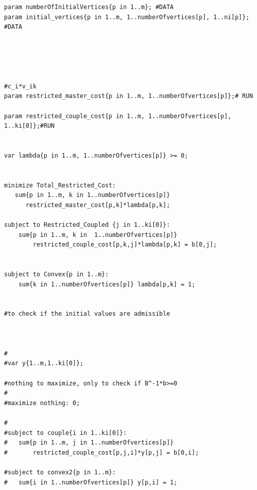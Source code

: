 \documentclass[a4paper,12pt]{article}
\begin{document}
\begin{lstlisting}
param numberOfInitialVertices{p in 1..m}; #DATA
param initial_vertices{p in 1..m, 1..numberOfvertices[p], 1..ni[p]}; #DATA





#c_i*v_ik
param restricted_master_cost{p in 1..m, 1..numberOfvertices[p]};# RUN

param restricted_couple_cost{p in 1..m, 1..numberOfvertices[p], 1..ki[0]};#RUN


var lambda{p in 1..m, 1..numberOfvertices[p]} >= 0;


minimize Total_Restricted_Cost:
   sum{p in 1..m, k in 1..numberOfvertices[p]} 
      restricted_master_cost[p,k]*lambda[p,k];

subject to Restricted_Coupled {j in 1..ki[0]}:
	sum{p in 1..m, k in  1..numberOfvertices[p]} 
		restricted_couple_cost[p,k,j]*lambda[p,k] = b[0,j];
      

subject to Convex{p in 1..m}: 
	sum{k in 1..numberOfvertices[p]} lambda[p,k] = 1;


#to check if the initial values are admissible



#
#var y{1..m,1..ki[0]}; 

#nothing to maximize, only to check if B^-1*b>=0
#
#maximize nothing: 0;

#
#subject to couple{i in 1..ki[0]}:
#	sum{p in 1..m, j in 1..numberOfvertices[p]}
#		restricted_couple_cost[p,j,i]*y[p,j] = b[0,i];
		
#subject to convex2{p in 1..m}:
#	sum{i in 1..numberOfvertices[p]} y[p,i] = 1;



\end{lstlisting}
\end{document}
